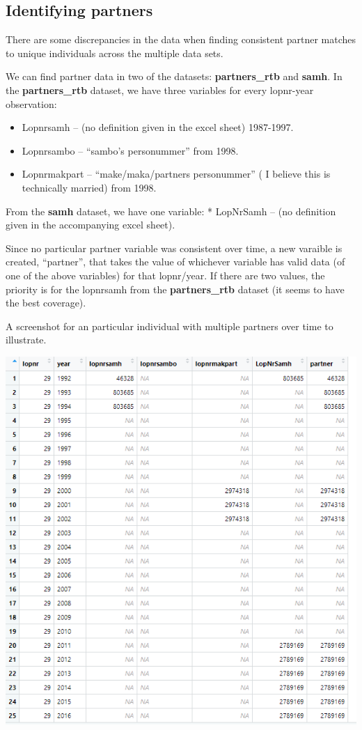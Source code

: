 \documentclass[
]{book}
\providecommand{\tightlist}{%
  \setlength{\itemsep}{0pt}\setlength{\parskip}{0pt}}
\begin{document}
\hypertarget{identifying-partners}{%
\subsection{Identifying partners}\label{identifying-partners}}

There are some discrepancies in the data when finding consistent partner matches to unique individuals across the multiple data sets.

We can find partner data in two of the datasets: \textbf{partners\_rtb} and \textbf{samh}. In the \textbf{partners\_rtb} dataset, we have three variables for every lopnr-year observation:

\begin{itemize}
\tightlist
\item
  Lopnrsamh -- (no definition given in the excel sheet) 1987-1997.
\item
  Lopnrsambo -- ``sambo's personummer'' from 1998.
\item
  Lopnrmakpart -- ``make/maka/partners personummer'' ( I believe this is technically married) from 1998.
\end{itemize}

From the \textbf{samh} dataset, we have one variable:
* LopNrSamh -- (no definition given in the accompanying excel sheet).

Since no particular partner variable was consistent over time, a new varaible is created, ``partner'', that takes the value of whichever variable has valid data (of one of the above variables) for that lopnr/year. If there are two values, the priority is for the lopnrsamh from the \textbf{partners\_rtb} dataset (it seems to have the best coverage).

A screenshot for an particular individual with multiple partners over time to illustrate.

\includegraphics[width=0.8\linewidth]{output/figures/partners_png}
\end{document}
